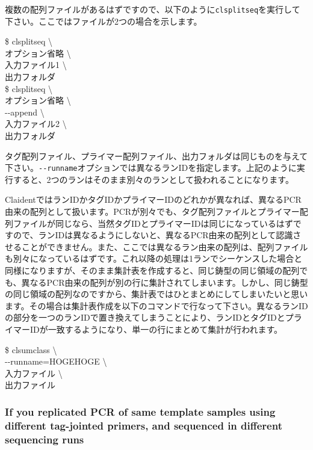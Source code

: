 \documentclass[titlepage,10pt,a4paper,english]{jsbook}
\newenvironment{cmd}{\begin{oframed}\raggedright\ttfamily\footnotesize\setlength{\baselineskip}{1.4em}}{\end{oframed}\vspace{-1em}}
\begin{document}
複数の配列ファイルがあるはずですので、以下のように\texttt{clsplitseq}を実行して下さい。ここではファイルが2つの場合を示します。
\begin{cmd}
\$ clsplitseq {\textbackslash}\\
オプション省略 {\textbackslash}\\
入力ファイル1 {\textbackslash}\\
出力フォルダ\\
\$ clsplitseq {\textbackslash}\\
オプション省略 {\textbackslash}\\
{-}{-}append {\textbackslash}\\
入力ファイル2 {\textbackslash}\\
出力フォルダ
\end{cmd}
タグ配列ファイル、プライマー配列ファイル、出力フォルダは同じものを与えて下さい。\texttt{{-}{-}runname}オプションでは異なるランIDを指定します。上記のように実行すると、2つのランはそのまま別々のランとして扱われることになります。

ClaidentではランIDかタグIDかプライマーIDのどれかが異なれば、異なるPCR由来の配列として扱います。PCRが別々でも、タグ配列ファイルとプライマー配列ファイルが同じなら、当然タグIDとプライマーIDは同じになっているはずですので、ランIDは異なるようにしないと、異なるPCR由来の配列として認識させることができません。また、ここでは異なるラン由来の配列は、配列ファイルも別々になっているはずです。これ以降の処理は1ランでシーケンスした場合と同様になりますが、そのまま集計表を作成すると、同じ鋳型の同じ領域の配列でも、異なるPCR由来の配列が別の行に集計されてしまいます。しかし、同じ鋳型の同じ領域の配列なのですから、集計表ではひとまとめにしてしまいたいと思います。その場合は集計表作成を以下のコマンドで行なって下さい。異なるランIDの部分を一つのランIDで置き換えてしまうことにより、ランIDとタグIDとプライマーIDが一致するようになり、単一の行にまとめて集計が行われます。
\begin{cmd}
\$ clsumclass {\textbackslash}\\
{-}{-}runname=HOGEHOGE {\textbackslash}\\
入力ファイル {\textbackslash}\\
出力ファイル
\end{cmd}

\subsubsection{If you replicated PCR of same template samples using different tag-jointed primers, and sequenced in different sequencing runs}
\end{document}
